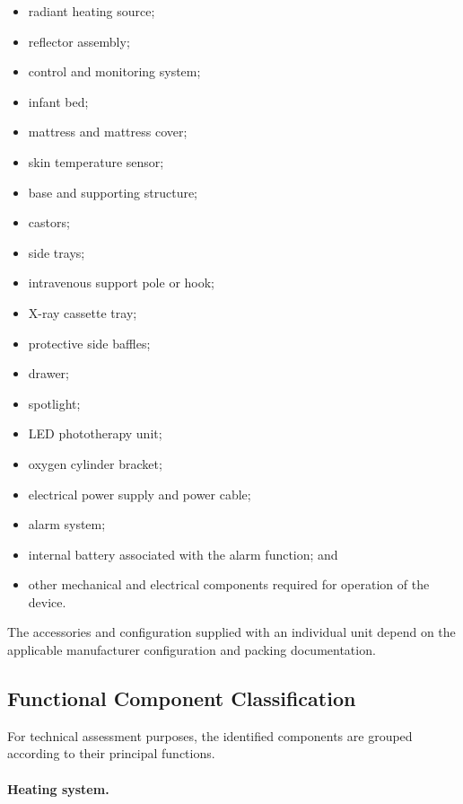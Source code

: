 \begin{itemize}
    \item radiant heating source;
    \item reflector assembly;
    \item control and monitoring system;
    \item infant bed;
    \item mattress and mattress cover;
    \item skin temperature sensor;
    \item base and supporting structure;
    \item castors;
    \item side trays;
    \item intravenous support pole or hook;
    \item X-ray cassette tray;
    \item protective side baffles;
    \item drawer;
    \item spotlight;
    \item LED phototherapy unit;
    \item oxygen cylinder bracket;
    \item electrical power supply and power cable;
    \item alarm system;
    \item internal battery associated with the alarm function; and
    \item other mechanical and electrical components required for
    operation of the device.
\end{itemize}

The accessories and configuration supplied with an individual unit
depend on the applicable manufacturer configuration and packing
documentation.


\subsection*{Functional Component Classification}

For technical assessment purposes, the identified components are
grouped according to their principal functions.

\paragraph{Heating system.}

